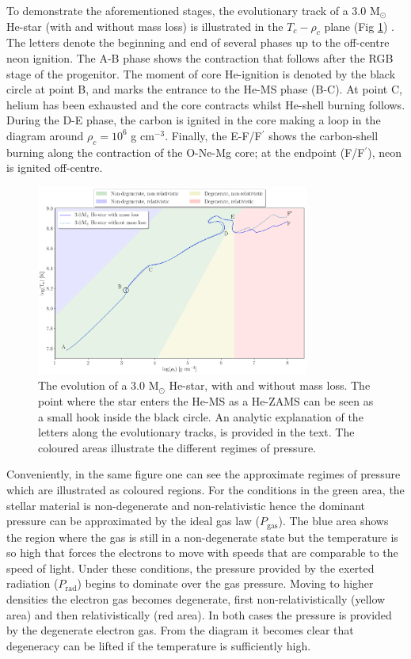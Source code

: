 \documentclass[../../main/thesis_msc.tex]{subfiles}
\begin{document}
				
				To demonstrate the aforementioned stages, the evolutionary track of a $3.0$ M$_{\odot}$ He-star (with and without mass loss) is illustrated in the $T_c - \rho_c$ plane (Fig \ref{fig:T_rho_plane_ch1}) \citep[see also][]{Habets_a, Habets_b, Nomoto1987}. The letters denote the beginning and end of several phases up to the off-centre neon ignition. The A-B phase shows the contraction that follows after the RGB stage of the progenitor. The moment of core He-ignition is denoted by the black circle at point B, and marks the entrance to the He-MS phase (B-C). At point C, helium has been exhausted and the core contracts whilst He-shell burning follows. During the D-E phase, the carbon is ignited in the core making a loop in the diagram around $\rho_c = 10^6$ g cm$^{-3}$. Finally, the E-F/F$^\prime$ shows the carbon-shell burning along the contraction of the O-Ne-Mg core; at the endpoint (F/F$^\prime$), neon is ignited off-centre.
				
				\begin{figure}[t]
					\centering
					\includegraphics[width=0.8\textwidth]{../figures/chapter1/T_rho_plane_ch1_shaded.png}
					\caption{The evolution of a $3.0$ M$_{\odot}$ He-star, with and without mass loss. The point where the star enters the He-MS as a He-ZAMS can be seen as a small hook inside the black circle. An analytic explanation of the letters along the evolutionary tracks, is provided in the text. The coloured areas illustrate the different regimes of pressure.}
					\label{fig:T_rho_plane_ch1}
				\end{figure}
				
				Conveniently, in the same figure one can see the approximate regimes of pressure which are illustrated as coloured regions. For the conditions in the green area, the stellar material is non-degenerate and non-relativistic hence the dominant pressure can be approximated by the ideal gas law ($P_{\text{gas}}$). The blue area shows the region where the gas is still in a non-degenerate state but the temperature is so high that forces the electrons to move with speeds that are comparable to the speed of light. Under these conditions, the pressure provided by the exerted radiation ($P_{\text{rad}}$) begins to dominate over the gas pressure. Moving to higher densities the electron gas becomes degenerate, first non-relativistically (yellow area) and then relativistically (red area). In both cases the pressure is provided by the degenerate electron gas. From the diagram it becomes clear that degeneracy can be lifted if the temperature is sufficiently high. 
				
\end{document}
